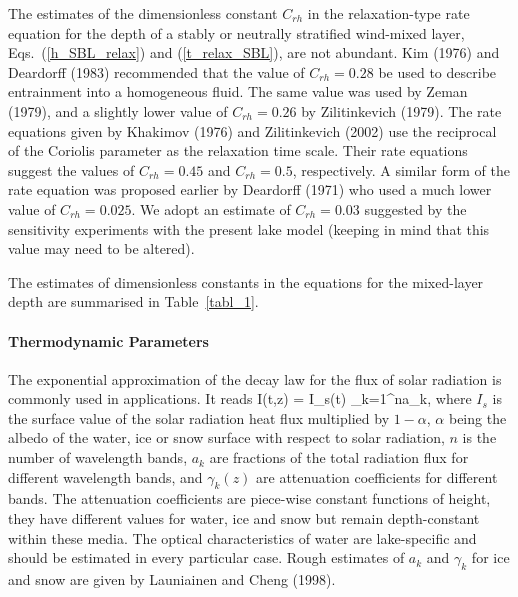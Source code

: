 The estimates of the dimensionless constant $C_{rh}$ in the relaxation-type rate equation 
for the depth of a stably or neutrally stratified wind-mixed layer, 
Eqs.~(\ref{h_SBL_relax}) and (\ref{t_relax_SBL}), are not abundant.
Kim (1976)\nocite{kim1976} and Deardorff (1983)\nocite{deardorff1983} recommended that the value of $C_{rh}=0.28$
be used to describe entrainment into a homogeneous fluid.
The same value was used by Zeman (1979)\nocite{zeman1979}, 
and a slightly lower value of $C_{rh}=0.26$ by Zilitinkevich \etal (1979)\nocite{zilitinchalik1979}. 
The rate equations given by Khakimov (1976)\nocite{khakimov1976} and Zilitinkevich \etal (2002) 
use the reciprocal of the Coriolis parameter as the relaxation time scale.
Their rate equations suggest the values of $C_{rh}=0.45$ and $C_{rh}=0.5$, respectively.
A similar form of the rate equation was proposed earlier by Deardorff (1971)\nocite{deardorff1971} 
who used a much lower value of $C_{rh}=0.025$.
We adopt an estimate of $C_{rh}=0.03$ suggested by the sensitivity experiments with the 
present lake model (keeping in mind that this value may need to be altered).

The estimates of dimensionless constants in the 
equations for the mixed-layer depth are summarised in Table~\ref{tabl_1}.


\paragraph{Thermodynamic Parameters}\label{empir_thermodyn}
\nopagebreak 
%
The exponential approximation of the decay law for the flux of solar radiation 
is commonly used in applications. It reads 
%
\beq\label{solrad_decay}
I(t,z) = I_s(t) \sum_{k=1}^{n}a_k\exp[-\gamma_k(z+H_S+H_I)] ,
\eeq
%
where $I_s$ is the surface value of the solar radiation heat flux
multiplied by $1-\alpha$, $\alpha$ being the albedo 
of the water, ice or snow surface with respect to solar radiation,
$n$ is the number of wavelength bands,
$a_k$ are fractions of the total radiation flux for different wavelength bands,
and $\gamma_k(z)$ are attenuation coefficients for different bands.
The attenuation coefficients are piece-wise constant functions of height,
\ie they have different values for water, ice and snow  
but remain depth-constant within these media. 
The optical characteristics of water are lake-specific and 
should be estimated in every particular case.
Rough estimates of $a_k$ and $\gamma_k$ for ice and snow 
are given by Launiainen and Cheng (1998)\nocite{launiainen1998}.

